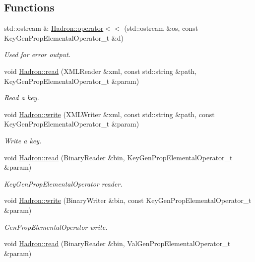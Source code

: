 \subsection*{Functions}
\begin{DoxyCompactItemize}
\item 
std\+::ostream \& \mbox{\hyperlink{namespaceHadron_a6bcf2658e0321428eeedf53a15a894aa}{Hadron\+::operator$<$$<$}} (std\+::ostream \&os, const Key\+Gen\+Prop\+Elemental\+Operator\+\_\+t \&d)
\begin{DoxyCompactList}\small\item\em Used for error output. \end{DoxyCompactList}\item 
void \mbox{\hyperlink{namespaceHadron_a9c6649bbe7b32cbc5fcbf8ebbf17d987}{Hadron\+::read}} (X\+M\+L\+Reader \&xml, const std\+::string \&path, Key\+Gen\+Prop\+Elemental\+Operator\+\_\+t \&param)
\begin{DoxyCompactList}\small\item\em Read a key. \end{DoxyCompactList}\item 
void \mbox{\hyperlink{namespaceHadron_a67dc2040c75fb33a942bc5a59243c4c3}{Hadron\+::write}} (X\+M\+L\+Writer \&xml, const std\+::string \&path, const Key\+Gen\+Prop\+Elemental\+Operator\+\_\+t \&param)
\begin{DoxyCompactList}\small\item\em Write a key. \end{DoxyCompactList}\item 
void \mbox{\hyperlink{namespaceHadron_ac6d19c651cf61c129b5cf86c15d13ab5}{Hadron\+::read}} (Binary\+Reader \&bin, Key\+Gen\+Prop\+Elemental\+Operator\+\_\+t \&param)
\begin{DoxyCompactList}\small\item\em Key\+Gen\+Prop\+Elemental\+Operator reader. \end{DoxyCompactList}\item 
void \mbox{\hyperlink{namespaceHadron_af1d6496318c689e52be27a9f842ccc2d}{Hadron\+::write}} (Binary\+Writer \&bin, const Key\+Gen\+Prop\+Elemental\+Operator\+\_\+t \&param)
\begin{DoxyCompactList}\small\item\em Gen\+Prop\+Elemental\+Operator write. \end{DoxyCompactList}\item 
void \mbox{\hyperlink{namespaceHadron_a26908582ef57fc950c0944a69dfcc275}{Hadron\+::read}} (Binary\+Reader \&bin, Val\+Gen\+Prop\+Elemental\+Operator\+\_\+t \&param)

\end{DoxyCompactItemize}
